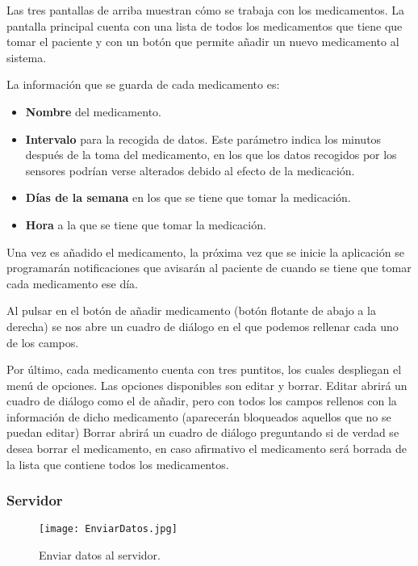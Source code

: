 \documentclass[11pt,spanish]{article}
\begin{document}
Las tres pantallas de arriba muestran cómo se trabaja con los medicamentos. La pantalla principal cuenta con una lista de todos los medicamentos que tiene que tomar el paciente y con un botón que permite añadir un nuevo medicamento al sistema.
\newline

La información que se guarda de cada medicamento es:

\begin{itemize}
	\item {\bf Nombre} del medicamento.
	\item {\bf Intervalo} para la recogida de datos. Este parámetro indica los minutos después de la toma del medicamento, en los que los datos recogidos por los sensores podrían verse alterados debido al efecto de la medicación.
	\item {\bf Días de la semana} en los que se tiene que tomar la medicación.
	\item {\bf Hora} a la que se tiene que tomar la medicación.
\end{itemize}

Una vez es añadido el medicamento, la próxima vez que se inicie la aplicación se programarán notificaciones que avisarán al paciente de cuando se tiene que tomar cada medicamento ese día.
\newline

Al pulsar en el botón de añadir medicamento (botón flotante de abajo a la derecha) se nos abre un cuadro de diálogo en el que podemos rellenar cada uno de los campos.
\newline

Por último, cada medicamento cuenta con tres puntitos, los cuales despliegan el menú de opciones. Las opciones disponibles son editar y borrar. Editar abrirá un cuadro de diálogo como el de añadir, pero con todos los campos rellenos con la información de dicho medicamento (aparecerán bloqueados aquellos que no se puedan editar) Borrar abrirá un cuadro de diálogo preguntando si de verdad se desea borrar el medicamento, en caso afirmativo el medicamento será borrada de la lista que contiene todos los medicamentos.

\subsubsection{Servidor}
\begin{figure}[!htb]
\centering
\texttt{[image: EnviarDatos.jpg]}
\caption{Enviar datos al servidor.}
\end{figure}
\end{document}
